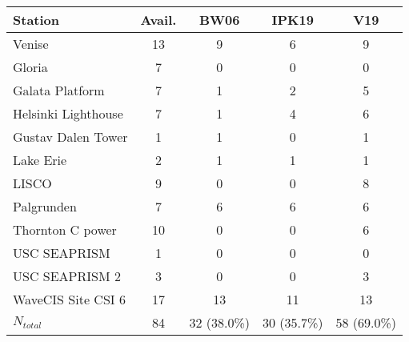 \documentclass[preview]{standalone}
\begin{document}
\begin{table}
\begin{tabular}{lcccc}\hline

Station 			& Avail.& BW06 	& IPK19 & V19	\\\hline
Venise 				& 13 	& 9 	& 6 	& 9 	\\
Gloria 				& 7 	& 0 	& 0 	& 0 	\\
Galata Platform 	& 7 	& 1 	& 2 	& 5 	\\
Helsinki Lighthouse & 7 	& 1 	& 4 	& 6 	\\
Gustav Dalen Tower 	& 1 	& 1 	& 0 	& 1 	\\
Lake Erie 			& 2 	& 1 	& 1 	& 1 	\\
LISCO 				& 9 	& 0 	& 0 	& 8 	\\
Palgrunden 			& 7 	& 6 	& 6 	& 6 	\\
Thornton C power 	& 10 	& 0 	& 0 	& 6 	\\
USC SEAPRISM 		& 1 	& 0 	& 0 	& 0 	\\
USC SEAPRISM 2 		& 3 	& 0 	& 0 	& 3 	\\
WaveCIS Site CSI 6 	& 17 	& 13 	& 11 	& 13 	\\\hline
$N_{total}$ 		& 84 	& 32 (38.0\%)	& 30 (35.7\%)	& 58 (69.0\%)	\\

\end{tabular}
\end{table}
\end{document}
